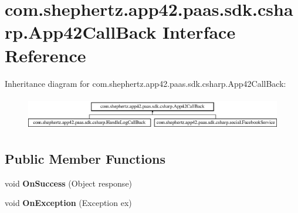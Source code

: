 \hypertarget{interfacecom_1_1shephertz_1_1app42_1_1paas_1_1sdk_1_1csharp_1_1_app42_call_back}{\section{com.\+shephertz.\+app42.\+paas.\+sdk.\+csharp.\+App42\+Call\+Back Interface Reference}
\label{interfacecom_1_1shephertz_1_1app42_1_1paas_1_1sdk_1_1csharp_1_1_app42_call_back}
}
Inheritance diagram for com.\+shephertz.\+app42.\+paas.\+sdk.\+csharp.\+App42\+Call\+Back\+:\begin{figure}[H]
\begin{center}
\leavevmode
\includegraphics[height=1.477572cm]{interfacecom_1_1shephertz_1_1app42_1_1paas_1_1sdk_1_1csharp_1_1_app42_call_back}
\end{center}
\end{figure}
\subsection*{Public Member Functions}
\begin{DoxyCompactItemize}
\item 
\hypertarget{interfacecom_1_1shephertz_1_1app42_1_1paas_1_1sdk_1_1csharp_1_1_app42_call_back_a677094e4162da840ad9278ad340f968d}{void {\bfseries On\+Success} (Object response)}\label{interfacecom_1_1shephertz_1_1app42_1_1paas_1_1sdk_1_1csharp_1_1_app42_call_back_a677094e4162da840ad9278ad340f968d}

\item 
\hypertarget{interfacecom_1_1shephertz_1_1app42_1_1paas_1_1sdk_1_1csharp_1_1_app42_call_back_aae9de304ea92ea277d72431a60f7bfb6}{void {\bfseries On\+Exception} (Exception ex)}\label{interfacecom_1_1shephertz_1_1app42_1_1paas_1_1sdk_1_1csharp_1_1_app42_call_back_aae9de304ea92ea277d72431a60f7bfb6}

\end{DoxyCompactItemize}
